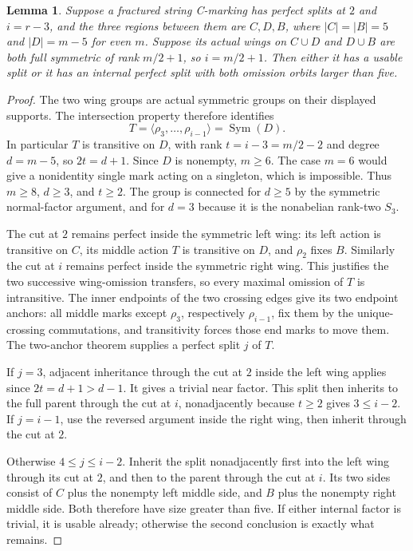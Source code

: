 \documentclass[11pt,a4paper]{article}
\newtheorem{lemma}{Lemma}
\newcommand{\gen}[1]{\langle#1\rangle}
\newcommand{\Sym}{\operatorname{Sym}}
\begin{document}
\begin{lemma}\label{opposite}
Suppose a fractured string C-marking has perfect splits at $2$
and $i=r-3$, and the three regions between them are $C,D,B$,
where $|C|=|B|=5$ and $|D|=m-5$ for even $m$.
Suppose its actual wings on $C\cup D$ and $D\cup B$ are both
full symmetric of rank $m/2+1$, so $i=m/2+1$.
Then either it has a usable split or it has an internal perfect
split with both omission orbits larger than five.
\end{lemma}
\begin{proof}
The two wing groups are actual symmetric groups on their displayed
supports. The intersection property therefore identifies
\[
 T=\gen{\rho_3,\ldots,\rho_{i-1}}=\Sym(D).
\]
In particular $T$ is transitive on $D$, with rank
$t=i-3=m/2-2$ and degree $d=m-5$, so $2t=d+1$.
Since $D$ is nonempty, $m\ge6$. The case $m=6$ would give
a nonidentity single mark acting on a singleton, which is impossible.
Thus $m\ge8$, $d\ge3$, and $t\ge2$.
The group is connected for $d\ge5$ by the symmetric normal-factor
argument, and for $d=3$ because it is the nonabelian rank-two $S_3$.

The cut at $2$ remains perfect inside the symmetric left wing:
its left action is transitive on $C$, its middle action $T$ is
transitive on $D$, and $\rho_2$ fixes $B$. Similarly the cut
at $i$ remains perfect inside the symmetric right wing. This
justifies the two successive wing-omission transfers, so every
maximal omission of $T$ is intransitive. The inner endpoints of
the two crossing edges give its two endpoint anchors: all middle
marks except $\rho_3$, respectively $\rho_{i-1}$, fix them
by the unique-crossing commutations, and transitivity forces those
end marks to move them. The two-anchor theorem supplies a perfect
split $j$ of $T$.

If $j=3$, adjacent inheritance through the cut at $2$ inside the
left wing applies since $2t=d+1>d-1$. It gives a trivial near
factor. This split then inherits to the full parent through the
cut at $i$, nonadjacently because $t\ge2$ gives $3\le i-2$.
If $j=i-1$, use the reversed argument inside the right wing, then
inherit through the cut at $2$.

Otherwise $4\le j\le i-2$. Inherit the split nonadjacently
first into the left wing through its cut at $2$, and then to the
parent through the cut at $i$. Its two sides consist of $C$ plus
the nonempty left middle side, and $B$ plus the nonempty right
middle side. Both therefore have size greater than five.
If either internal factor is trivial, it is usable already;
otherwise the second conclusion is exactly what remains.
\end{proof}
\end{document}
